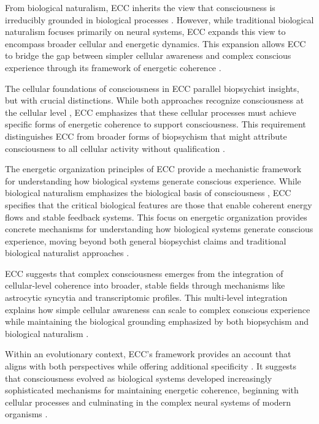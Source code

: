 \begin{refsection}
From biological naturalism, ECC inherits the view that consciousness is irreducibly grounded in biological processes \cite{searle2017biological}. However, while traditional biological naturalism focuses primarily on neural systems, ECC expands this view to encompass broader cellular and energetic dynamics. This expansion allows ECC to bridge the gap between simpler cellular awareness and complex conscious experience through its framework of energetic coherence \cite{van2006principles}.

The cellular foundations of consciousness in ECC parallel biopsychist insights, but with crucial distinctions. While both approaches recognize consciousness at the cellular level \cite{lyon2015cognitive}, ECC emphasizes that these cellular processes must achieve specific forms of energetic coherence to support consciousness. This requirement distinguishes ECC from broader forms of biopsychism that might attribute consciousness to all cellular activity without qualification \cite{margulis2000life}.

The energetic organization principles of ECC provide a mechanistic framework for understanding how biological systems generate conscious experience. While biological naturalism emphasizes the biological basis of consciousness \cite{searle1992rediscovery}, ECC specifies that the critical biological features are those that enable coherent energy flows and stable feedback systems. This focus on energetic organization provides concrete mechanisms for understanding how biological systems generate conscious experience, moving beyond both general biopsychist claims and traditional biological naturalist approaches \cite{thompson2010mind}.

ECC suggests that complex consciousness emerges from the integration of cellular-level coherence into broader, stable fields through mechanisms like astrocytic syncytia and transcriptomic profiles. This multi-level integration explains how simple cellular awareness can scale to complex conscious experience while maintaining the biological grounding emphasized by both biopsychism and biological naturalism \cite{godfrey2016other}.

Within an evolutionary context, ECC's framework provides an account that aligns with both perspectives while offering additional specificity \cite{varela1997patterns}. It suggests that consciousness evolved as biological systems developed increasingly sophisticated mechanisms for maintaining energetic coherence, beginning with cellular processes and culminating in the complex neural systems of modern organisms \cite{deacon2011incomplete}.


\end{refsection}
